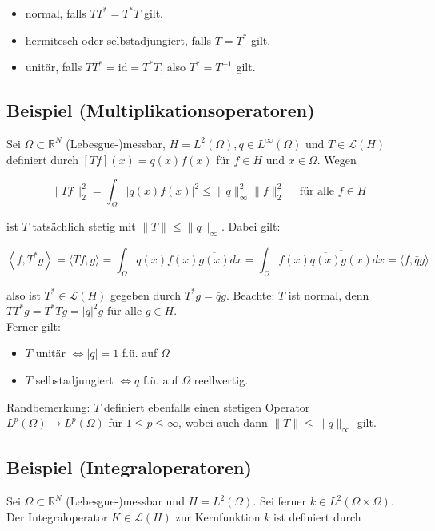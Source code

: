 \documentclass[10pt, letterpaper]{article}
\begin{document}
\begin{itemize}
  \item normal, falls $T T^{*}=T^{*} T$ gilt.
  \item hermitesch oder selbstadjungiert, falls $T=T^{*}$ gilt.
  \item unitär, falls $T T^{*}=\mathrm{id}=T^{*} T$, also $T^{*}=T^{-1}$ gilt.
\end{itemize}

\subsection*{Beispiel (Multiplikationsoperatoren)}
Sei $\Omega \subset \mathbb{R}^{N}$ (Lebesgue-)messbar, $H=L^{2}(\Omega), q \in L^{\infty}(\Omega)$ und $T \in \mathcal{L}(H)$ definiert durch $[T f](x)=q(x) f(x)$ für $f \in H$ und $x \in \Omega$. Wegen

$$
\|T f\|_{2}^{2}=\int_{\Omega}|q(x) f(x)|^{2} \leq\|q\|_{\infty}^{2}\|f\|_{2}^{2} \quad \text { für alle } f \in H
$$

ist $T$ tatsächlich stetig mit $\|T\| \leq\|q\|_{\infty}$. Dabei gilt:

$$
\left\langle f, T^{*} g\right\rangle=\langle T f, g\rangle=\int_{\Omega} q(x) f(x) \overline{g(x)} d x=\int_{\Omega} f(x) \overline{\overline{q(x)} g(x)} d x=\langle f, \bar{q} g\rangle
$$

also ist $T^{*} \in \mathcal{L}(H)$ gegeben durch $T^{*} g=\bar{q} g$. Beachte: $T$ ist normal, denn $T T^{*} g= T^{*} T g=|q|^{2} g$ für alle $g \in H$.\\
Ferner gilt:

\begin{itemize}
  \item $T$ unitär $\Longleftrightarrow|q|=1$ f.ü. auf $\Omega$
  \item $T$ selbstadjungiert $\Longleftrightarrow q$ f.ü. auf $\Omega$ reellwertig.
\end{itemize}

Randbemerkung: $T$ definiert ebenfalls einen stetigen Operator $L^{p}(\Omega) \rightarrow L^{p}(\Omega)$ für $1 \leq p \leq \infty$, wobei auch dann $\|T\| \leq\|q\|_{\infty}$ gilt.

\subsection*{Beispiel (Integraloperatoren)}
Sei $\Omega \subset \mathbb{R}^{N}$ (Lebesgue-)messbar und $H=L^{2}(\Omega)$. Sei ferner $k \in L^{2}(\Omega \times \Omega)$. Der Integraloperator $K \in \mathcal{L}(H)$ zur Kernfunktion $k$ ist definiert durch
\end{document}

